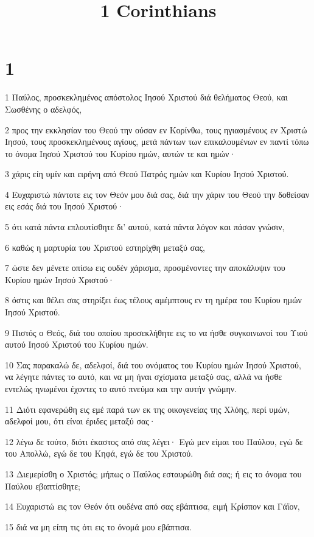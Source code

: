 

\title{1 Corinthians}


\chapter{1}

\par 1 Παύλος, προσκεκλημένος απόστολος Ιησού Χριστού διά θελήματος Θεού, και Σωσθένης ο αδελφός,
\par 2 προς την εκκλησίαν του Θεού την ούσαν εν Κορίνθω, τους ηγιασμένους εν Χριστώ Ιησού, τους προσκεκλημένους αγίους, μετά πάντων των επικαλουμένων εν παντί τόπω το όνομα Ιησού Χριστού του Κυρίου ημών, αυτών τε και ημών·
\par 3 χάρις είη υμίν και ειρήνη από Θεού Πατρός ημών και Κυρίου Ιησού Χριστού.
\par 4 Ευχαριστώ πάντοτε εις τον Θεόν μου διά σας, διά την χάριν του Θεού την δοθείσαν εις εσάς διά του Ιησού Χριστού·
\par 5 ότι κατά πάντα επλουτίσθητε δι' αυτού, κατά πάντα λόγον και πάσαν γνώσιν,
\par 6 καθώς η μαρτυρία του Χριστού εστηρίχθη μεταξύ σας,
\par 7 ώστε δεν μένετε οπίσω εις ουδέν χάρισμα, προσμένοντες την αποκάλυψιν του Κυρίου ημών Ιησού Χριστού·
\par 8 όστις και θέλει σας στηρίξει έως τέλους αμέμπτους εν τη ημέρα του Κυρίου ημών Ιησού Χριστού.
\par 9 Πιστός ο Θεός, διά του οποίου προσεκλήθητε εις το να ήσθε συγκοινωνοί του Υιού αυτού Ιησού Χριστού του Κυρίου ημών.
\par 10 Σας παρακαλώ δε, αδελφοί, διά του ονόματος του Κυρίου ημών Ιησού Χριστού, να λέγητε πάντες το αυτό, και να μη ήναι σχίσματα μεταξύ σας, αλλά να ήσθε εντελώς ηνωμένοι έχοντες το αυτό πνεύμα και την αυτήν γνώμην.
\par 11 Διότι εφανερώθη εις εμέ παρά των εκ της οικογενείας της Χλόης, περί υμών, αδελφοί μου, ότι είναι έριδες μεταξύ σας·
\par 12 λέγω δε τούτο, διότι έκαστος από σας λέγει· Εγώ μεν είμαι του Παύλου, εγώ δε του Απολλώ, εγώ δε του Κηφά, εγώ δε του Χριστού.
\par 13 Διεμερίσθη ο Χριστός; μήπως ο Παύλος εσταυρώθη διά σας; ή εις το όνομα του Παύλου εβαπτίσθητε;
\par 14 Ευχαριστώ εις τον Θεόν ότι ουδένα από σας εβάπτισα, ειμή Κρίσπον και Γάϊον,
\par 15 διά να μη είπη τις ότι εις το όνομά μου εβάπτισα.
